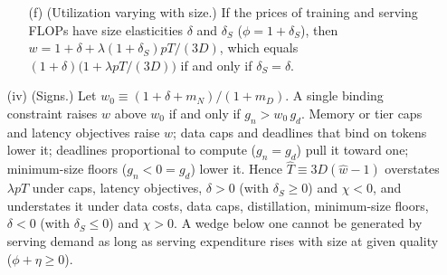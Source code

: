 \begin{proposition}
\begin{enumerate}
\begin{enumerate}
\item[(f)] (Utilization varying with size.) If the prices of training and serving FLOPs have size elasticities $\delta$
and $\delta_S$ ($\phi=1+\delta_S$), then $w=1+\delta+\lambda(1+\delta_S)pT/(3D)$, which equals
$(1+\delta)\big(1+\lambda pT/(3D)\big)$ if and only if $\delta_S=\delta$.
\end{enumerate}
\item[(iv)] (Signs.) Let $w_0\equiv(1+\delta+m_N)/(1+m_D)$. A single binding constraint raises $w$ above $w_0$ if and only
if $g_n>w_0\,g_d$. Memory or tier caps and latency objectives raise $w$; data caps and
deadlines that bind on tokens lower it; deadlines proportional to compute ($g_n=g_d$) pull it toward one; minimum-size
floors ($g_n<0=g_d$) lower it. Hence $\hat T\equiv3D(\hat w-1)$ overstates $\lambda pT$ under caps, latency objectives,
$\delta>0$ (with $\delta_S\ge0$) and $\chi<0$, and understates it under data costs, data caps, distillation, minimum-size
floors, $\delta<0$ (with $\delta_S\le0$) and $\chi>0$. A wedge below one cannot be generated by serving demand as long as
serving expenditure rises with size at given quality ($\phi+\eta\ge0$).
\end{enumerate}
\end{proposition}

